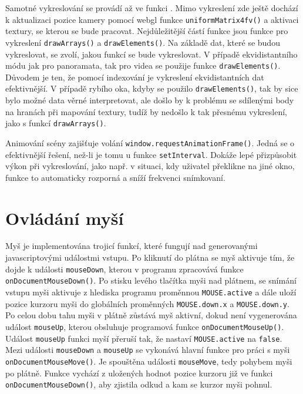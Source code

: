 Samotné vykreslování se provádí až ve funkci \texttt{\render}. Mimo vykreslení zde ještě dochází k aktualizaci pozice kamery pomocí webgl funkce \texttt{uniformMatrix4fv()} a aktivaci textury, se kterou se bude pracovat. Nejdůležitější částí funkce \texttt{\render} jsou funkce pro vykreslení \texttt{drawArrays()} a \texttt{drawElements()}. Na základě dat, které se budou vykreslovat, se zvolí, jakou funkcí se bude vykreslovat. V případě ekvidistantního módu jak pro panoramata, tak pro videa se použije funkce  \texttt{drawElements()}. Důvodem je ten, že pomocí indexování je vykreslení ekvidistantních dat efektivnější. V případě rybího oka, kdyby se použilo \texttt{drawElements()}, tak by sice bylo možné data věrné interpretovat, ale došlo by k problému se sdílenými body na hranách při mapování textury, tudíž by nedošlo k tak přesnému vykreslení, jako s funkcí \texttt{drawArrays()}.

Animování scény zajišťuje volání \texttt{window.requestAnimationFrame()}. Jedná se o efektivnější řešení, než-li je tomu u funkce \texttt{setInterval}. Dokáže lepé přizpůsobit výkon při vykreslování, jako např. v situaci, kdy uživatel překlikne na jiné okno, funkce to automaticky rozporná a sníží frekvenci snímkovaní.



\section{Ovládání myší}
Myš je implementována trojicí funkcí, které fungují nad generovanými javascriptovými událostmi vstupu. Po kliknutí do plátna se myš aktivuje tím, že dojde k události \texttt{mouseDown}, kterou v programu zpracovává funkce \texttt{onDocumentMouseDown()}. Po stisku levého tlačítka myši nad plátnem, se snímání vstupu myši aktivuje z hlediska programu proměnnou \texttt{MOUSE.active} a dále uloží pozice kurzoru myši do globálních proměnných \texttt{MOUSE.down.x} a \texttt{MOUSE.down.y}. Po celou dobu tahu myši v plátně zůstává myš aktivní, dokud není vygenerována událost \texttt{mouseUp}, kterou obsluhuje programová funkce \texttt{onDocumentMouseUp()}. Událost \texttt{mouseUp} funkci myší přeruší tak, že nastaví \texttt{MOUSE.active} na \texttt{false}. Mezi události \texttt{mouseDown} a \texttt{mouseUp} se vykonává hlavní funkce pro práci s myši \texttt{onDocumentMouseMove()}. Je spouštěna události \texttt{mouseMove}, tedy pohybem myši po plátně. Funkce vychází z uložených hodnot pozice kurzoru již ve funkci \texttt{onDocumentMouseDown()}, aby zjistila odkud a kam se kurzor myši pohnul. 


